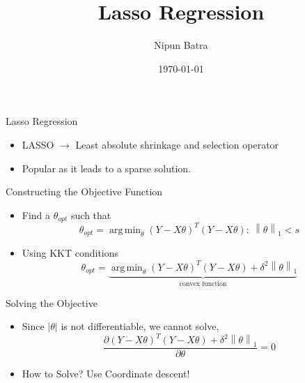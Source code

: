 \documentclass{beamer}
\title{Lasso Regression}
\date{\today}
\author{Nipun Batra}
\institute{IIT Gandhinagar}
\newcommand{\norm}[1]{\left\lVert#1\right\rVert}
\DeclareMathOperator*{\argmin}{arg\,min}
\begin{document}
  \maketitle
  
  
  
  

\begin{frame}{Lasso Regression}
\begin{itemize}[<+->]
	
	
	\item LASSO $\longrightarrow$ Least absolute shrinkage and selection operator
	\item Popular as it leads to a sparse solution.
	
\end{itemize}
\end{frame}

\begin{frame}{Constructing the Objective Function}
\begin{itemize}[<+->]

\item Find a $\theta_{opt}$ such that  \begin{equation}    \theta_{opt} =  \argmin_{\theta} {(Y-X\theta)^T(Y-X\theta)} : \ \norm{\theta}_1<s \end{equation}
\item Using KKT conditions
\begin{equation}
    \theta_{opt} = \underbrace{\argmin_{\theta}{(Y-X\theta)^T(Y-X\theta) + \delta^2\norm{\theta}_1}}_\text{convex function}
\end{equation}
	
\end{itemize}


\end{frame}

\begin{frame}{Solving the Objective}
\begin{itemize}[<+->]

\item Since $|\theta|$ is not differentiable, we cannot solve,  \begin{equation}    \frac{\partial {(Y-X\theta)^T(Y-X\theta) + \delta^2\norm{\theta}_1}}{\partial \theta} = 0 \end{equation}

\item How to Solve?
Use Coordinate descent!
\end{itemize}

\end{frame}
\end{document}
